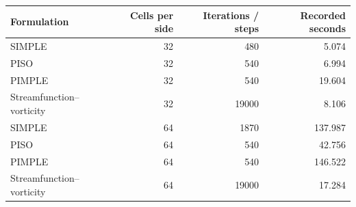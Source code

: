 \begin{center}\small
\begin{tabular}{lrrr}\toprule
Formulation & Cells per side & Iterations / steps & Recorded seconds\\\midrule
SIMPLE & 32 & 480 & 5.074\\
PISO & 32 & 540 & 6.994\\
PIMPLE & 32 & 540 & 19.604\\
Streamfunction--vorticity & 32 & 19000 & 8.106\\
SIMPLE & 64 & 1870 & 137.987\\
PISO & 64 & 540 & 42.756\\
PIMPLE & 64 & 540 & 146.522\\
Streamfunction--vorticity & 64 & 19000 & 17.284\\
\bottomrule\end{tabular}\end{center}
